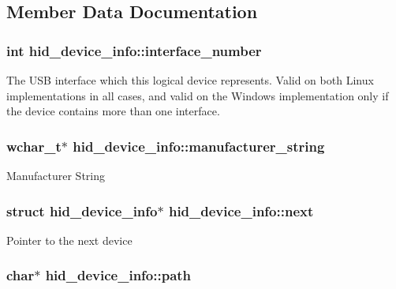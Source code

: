 \subsection{\-Member \-Data \-Documentation}
\hypertarget{structhid__device__info_a9163d8d5d7db8dc47bddfaf876e17547}{
\subsubsection[{interface\-\_\-number}]{\setlength{\rightskip}{0pt plus 5cm}int {\bf hid\-\_\-device\-\_\-info\-::interface\-\_\-number}}}\label{structhid__device__info_a9163d8d5d7db8dc47bddfaf876e17547}
\-The \-U\-S\-B interface which this logical device represents. \-Valid on both \-Linux implementations in all cases, and valid on the \-Windows implementation only if the device contains more than one interface. \hypertarget{structhid__device__info_a484eebf746220cd2910954cc861759b7}{
\subsubsection[{manufacturer\-\_\-string}]{\setlength{\rightskip}{0pt plus 5cm}wchar\-\_\-t$\ast$ {\bf hid\-\_\-device\-\_\-info\-::manufacturer\-\_\-string}}}\label{structhid__device__info_a484eebf746220cd2910954cc861759b7}
\-Manufacturer \-String \hypertarget{structhid__device__info_a2bfebc240baf3bdaf03965816e11f149}{
\subsubsection[{next}]{\setlength{\rightskip}{0pt plus 5cm}struct {\bf hid\-\_\-device\-\_\-info}$\ast$ {\bf hid\-\_\-device\-\_\-info\-::next}}}\label{structhid__device__info_a2bfebc240baf3bdaf03965816e11f149}
\-Pointer to the next device \hypertarget{structhid__device__info_a6384b5bf4d9583598e5f5a889f240921}{
\subsubsection[{path}]{\setlength{\rightskip}{0pt plus 5cm}char$\ast$ {\bf hid\-\_\-device\-\_\-info\-::path}}}\label{structhid__device__info_a6384b5bf4d9583598e5f5a889f240921}
